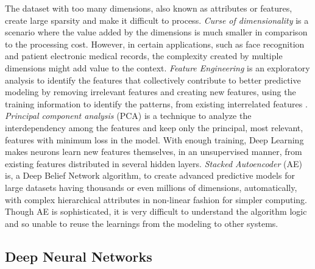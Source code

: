 \documentclass[sigconf]{acmart}
\begin{document}
	The dataset with too many dimensions, also known as attributes or features, create large sparsity and make it difficult to process. {\em Curse of dimensionality} is a scenario where the value added by the dimensions is much smaller in comparison to the processing cost. However, in certain applications, such as face recognition and patient electronic medical records, the complexity created by multiple dimensions might add value to the context. {\em Feature Engineering} is an exploratory analysis to identify the features that collectively contribute to better predictive modeling by removing irrelevant features and creating new features, using the training information to identify the patterns, from existing interrelated features \cite{JasonBrownlee2014}. {\em Principal component analysis} (PCA) is a technique to analyze the interdependency among the features and keep only the principal, most relevant, features with minimum loss in the model. With enough training, Deep Learning makes neurons learn new features themselves, in an unsupervised manner, from existing features distributed in several hidden layers. {\em Stacked Autoencoder} (AE) is, a Deep Belief Network algorithm, to create advanced predictive models for large datasets having thousands or even millions of dimensions, automatically, with complex hierarchical attributes in non-linear fashion for simpler computing. Though AE is sophisticated, it is very difficult to understand the algorithm logic and so unable to reuse the learnings from the modeling to other systems. 
		
	
	\subsection{Deep Neural Networks}
	
\end{document}
